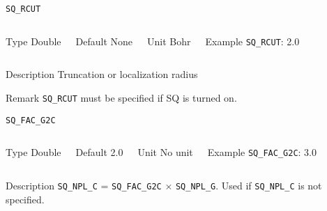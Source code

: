 \begin{frame}[allowframebreaks]{\texttt{{SQ\_RCUT}}} \label{SQ_RCUT}
\vspace*{-12pt}
\begin{columns}
\begin{block}{Type}
Double
\end{block}

\begin{block}{Default}
None
\end{block}

\begin{block}{Unit}
Bohr
\end{block}

\begin{block}{Example}
\texttt{SQ\_RCUT}: 2.0
\end{block}
\end{columns}

\begin{block}{Description}
Truncation or localization radius
\end{block}

\begin{block}{Remark}
\texttt{{SQ\_RCUT}} must be specified if SQ is turned on.
\end{block}
\end{frame}


\begin{frame}[allowframebreaks]{\texttt{{SQ\_FAC\_G2C}}} \label{SQ_FAC_G2C}
\vspace*{-12pt}
\begin{columns}
\begin{block}{Type}
Double
\end{block}

\begin{block}{Default}
2.0
\end{block}

\begin{block}{Unit}
No unit
\end{block}

\begin{block}{Example}
\texttt{SQ\_FAC\_G2C}: 3.0
\end{block}
\end{columns}

\begin{block}{Description}
\texttt{SQ\_NPL\_C} = \texttt{SQ\_FAC\_G2C} $\times$ \texttt{SQ\_NPL\_G}. Used if \texttt{SQ\_NPL\_C} is not specified.
\end{block}

\end{frame}


